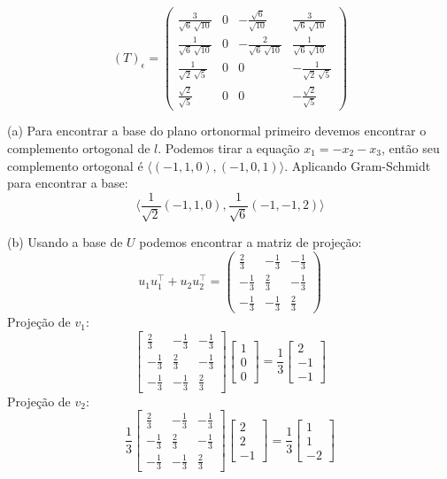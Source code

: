 \documentclass{homework}
\begin{document}
\[(T)_\epsilon = \begin{pmatrix}\frac{3}{\sqrt{6}\, \sqrt{10}} & 0 & -\frac{\sqrt{6}}{\sqrt{10}} & \frac{3}{\sqrt{6}\, \sqrt{10}}\\
\frac{1}{\sqrt{6}\, \sqrt{10}} & 0 & -\frac{2}{\sqrt{6}\, \sqrt{10}} & \frac{1}{\sqrt{6}\, \sqrt{10}}\\
\frac{1}{\sqrt{2}\, \sqrt{5}} & 0 & 0 & -\frac{1}{\sqrt{2}\, \sqrt{5}}\\
\frac{\sqrt{2}}{\sqrt{5}} & 0 & 0 & -\frac{\sqrt{2}}{\sqrt{5}}\end{pmatrix}\]

\exercise*
(a) Para encontrar a base do plano ortonormal primeiro devemos encontrar o complemento ortogonal de $l$. Podemos tirar a equação $x_1=-x_2-x_3$, então seu complemento ortogonal é $\langle(-1,1,0),(-1,0,1)\rangle$. Aplicando Gram-Schmidt para encontrar a base:
\[\langle\frac{1}{\sqrt{2}}(-1,1,0),\frac{1}{\sqrt{6}}(-1,-1,2)\rangle\]

(b) Usando a base de $U$ podemos encontrar a matriz de projeção:
\[u_1u_1^\top + u_2u_2^\top = \begin{pmatrix}\frac{2}{3} & -\frac{1}{3} & -\frac{1}{3}\\
-\frac{1}{3} & \frac{2}{3} & -\frac{1}{3}\\
-\frac{1}{3} & -\frac{1}{3} & \frac{2}{3}\end{pmatrix}\]
Projeção de $v_1$:
\[\begin{bmatrix}
\frac{2}{3} & -\frac{1}{3} & -\frac{1}{3}\\
-\frac{1}{3} & \frac{2}{3} & -\frac{1}{3}\\
-\frac{1}{3} & -\frac{1}{3} & \frac{2}{3}
\end{bmatrix}
\begin{bmatrix}
1\\
0\\
0
\end{bmatrix} = \frac{1}{3}\begin{bmatrix}
2\\
-1\\
-1
\end{bmatrix}\]
Projeção de $v_2$:
\[\frac{1}{3}\begin{bmatrix}
\frac{2}{3} & -\frac{1}{3} & -\frac{1}{3}\\
-\frac{1}{3} & \frac{2}{3} & -\frac{1}{3}\\
-\frac{1}{3} & -\frac{1}{3} & \frac{2}{3}
\end{bmatrix}
\begin{bmatrix}
2\\
2\\
-1
\end{bmatrix} = \frac{1}{3}\begin{bmatrix}
1\\
1\\
-2
\end{bmatrix}\]
\end{document}
